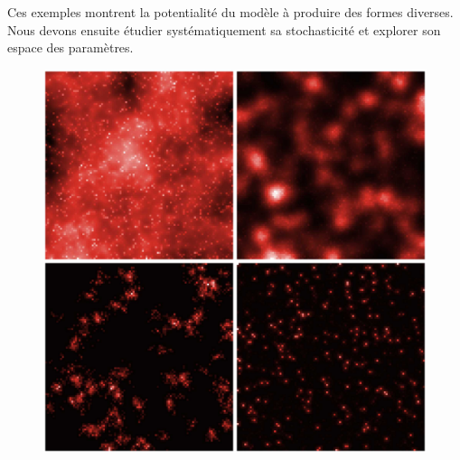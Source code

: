 Ces exemples montrent la potentialité du modèle à produire des formes diverses. Nous devons ensuite étudier systématiquement sa stochasticité et explorer son espace des paramètres.



\begin{figure}
\includegraphics[width=\linewidth]{Figures/Final/5-2-2-fig-density-fig2}

\end{figure}
